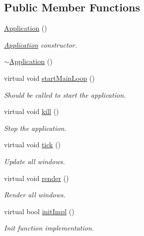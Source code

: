 \subsection*{Public Member Functions}
\begin{DoxyCompactItemize}
\item 
\mbox{\hyperlink{classec_1_1_application_af2a7b16d775fbce44dc0035fb96513f3}{Application}} ()
\begin{DoxyCompactList}\small\item\em \mbox{\hyperlink{classec_1_1_application}{Application}} constructor. \end{DoxyCompactList}\item 
\mbox{\hyperlink{classec_1_1_application_abe00fd469062e9710bfda9f9d13765f3}{$\sim$\+Application}} ()
\item 
virtual void \mbox{\hyperlink{classec_1_1_application_ad541044a8fc0ff8d6c3fc57220109a50}{start\+Main\+Loop}} ()
\begin{DoxyCompactList}\small\item\em Should be called to start the application. \end{DoxyCompactList}\item 
virtual void \mbox{\hyperlink{classec_1_1_application_a2a4c494f47bc187ddc2bb5411aa063a3}{kill}} ()
\begin{DoxyCompactList}\small\item\em Stop the application. \end{DoxyCompactList}\item 
virtual void \mbox{\hyperlink{classec_1_1_application_a036ae53bcbf708c7a01deb199feeccdf}{tick}} ()
\begin{DoxyCompactList}\small\item\em Update all windows. \end{DoxyCompactList}\item 
virtual void \mbox{\hyperlink{classec_1_1_application_a4fe5dcd06017ba4322eca3adec47e03e}{render}} ()
\begin{DoxyCompactList}\small\item\em Render all windows. \end{DoxyCompactList}\item 
virtual bool \mbox{\hyperlink{classec_1_1_application_a1460d7083c312271285747a7cc03f7e8}{init\+Impl}} ()
\begin{DoxyCompactList}\small\item\em Init function implementation. \end{DoxyCompactList}\item 

\end{DoxyCompactItemize}
